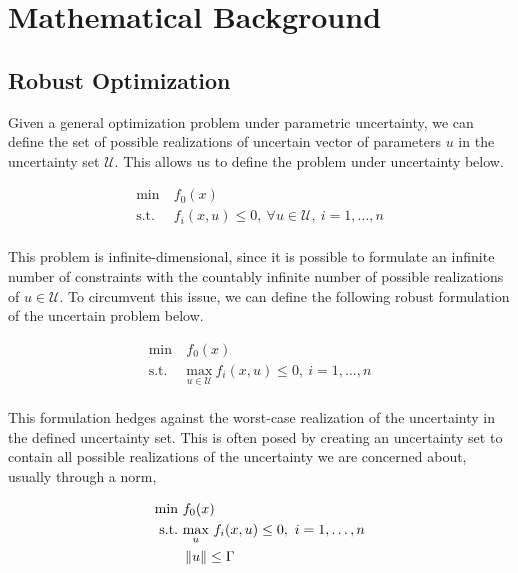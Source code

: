\section{Mathematical Background}

\subsection{Robust Optimization}

Given a general optimization problem under parametric uncertainty, we can define the set of possible
realizations of uncertain vector of parameters $u$ in the uncertainty set $\mathcal{U}$. This
allows us to define the problem under uncertainty below.

\begin{align*}
    \text{min} &~f_0(x) \\
    \text{s.t.}     &~f_i(x,u) \leq 0,~\forall u \in \mathcal{U},~i = 1,\ldots,n \\
\end{align*}

This problem is infinite-dimensional, since it is possible to formulate an infinite number of constraints
with the countably infinite number of possible realizations of $u \in \mathcal{U}$. To circumvent this issue,
we can define the following robust formulation of the uncertain problem below.

\begin{align*}
    \text{min} &~f_0(x) \\
    \text{s.t.}     &~\underset{u \in \mathcal{U}}{\text{max}}~f_i(x,u) \leq 0,~i = 1,\ldots,n \\
\end{align*}

This formulation hedges against the worst-case realization of the uncertainty in the defined uncertainty
set. This is often posed by creating an uncertainty set to contain all possible
realizations of the uncertainty we are concerned about, usually through a norm,

\begin{equation}
\begin{aligned}
    \text{min} &~f_0(x) \\
    \text{s.t.}     &~\underset{u}{\text{max}}~f_i(x,u) \leq 0,~i = 1,\ldots,n \\
                    &~\left\lVert u\right\rVert \leq \Gamma \\
\end{aligned}
        \label{eq:normform}
\end{equation}

